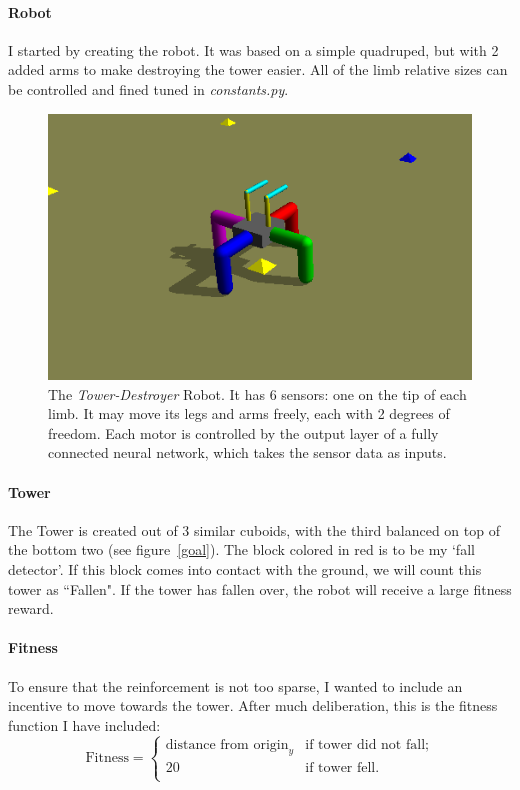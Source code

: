 \documentclass[12pt, a4paper]{article}
\begin{document}
\paragraph{Robot}
I started by creating the robot. It was based on a simple quadruped, but with 2 added arms to make destroying the tower easier. All of the limb relative sizes can be controlled and fined tuned in \emph{constants.py}.\par
\begin{figure}[h]
	\centering
	\includegraphics{robot.png}
	\caption{The \emph{Tower-Destroyer} Robot. It has 6 sensors: one on the tip of each limb. It may move its legs and arms freely, each with 2 degrees of freedom. Each motor is controlled by the output layer of a fully connected neural network, which takes the sensor data as inputs. }
\end{figure}
\paragraph{Tower}
The Tower is created out of 3 similar cuboids, with the third balanced on top of the bottom two (see figure~\ref{goal}). The block colored in red is to be my `fall detector'. If this block comes into contact with the ground, we will count this tower as ``Fallen". If the tower has fallen over, the robot will receive a large fitness reward.
\paragraph{Fitness} To ensure that the reinforcement is not too sparse, I wanted to include an incentive to move towards the tower. After much deliberation, this is the fitness function I have included:
$$
\text{Fitness} = \begin{cases}
\text{distance from origin}_y & \text{if tower did not fall};\\
20 & \text{if tower fell.}\\
\end{cases}
$$
\end{document}
